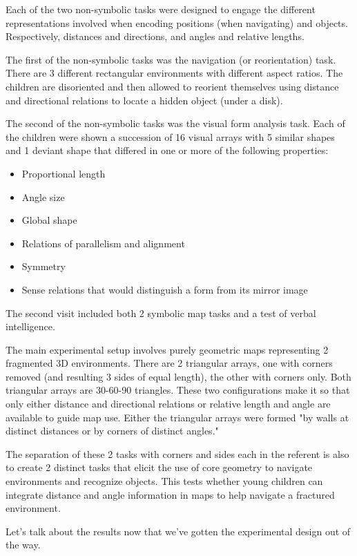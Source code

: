 \documentclass[12pt, letterpaper]{article}
\begin{document}
\begin{spacing}{1.10}
Each of the two non-symbolic tasks were designed to engage the different representations involved when encoding positions (when navigating) and objects. Respectively, distances and directions, and angles and relative lengths.

The first of the non-symbolic tasks was the navigation (or reorientation) task. There are 3 different rectangular environments with different aspect ratios. The children are disoriented and then allowed to reorient themselves using distance and directional relations to locate a hidden object (under a disk).

The second of the non-symbolic tasks was the visual form analysis task. Each of the children were shown a succession of 16 visual arrays with 5 similar shapes and 1 deviant shape that differed in one or more of the following properties:
\begin{itemize}
    \item Proportional length
    \item Angle size
    \item Global shape
    \item Relations of parallelism and alignment
    \item Symmetry
    \item Sense relations that would distinguish a form from its mirror image
\end{itemize}

The second visit included both 2 symbolic map tasks and a test of verbal intelligence.

The main experimental setup involves purely geometric maps representing 2 fragmented 3D environments. There are 2 triangular arrays, one with corners removed (and resulting 3 sides of equal length), the other with corners only. Both triangular arrays are 30-60-90 triangles. These two configurations make it so that only either distance and directional relations or relative length and angle are available to guide map use. Either the triangular arrays were formed "by walls at distinct distances or by corners of distinct angles."

The separation of these 2 tasks with corners and sides each in the referent is also to create 2 distinct tasks that elicit the use of core geometry to navigate environments and recognize objects. This tests whether young children can integrate distance and angle information in maps to help navigate a fractured environment.

Let's talk about the results now that we've gotten the experimental design out of the way.


\end{spacing}
\end{document}
